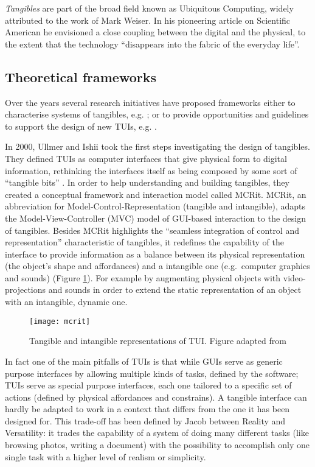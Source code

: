 \emph{Tangibles} are part of the broad field known as Ubiquitous Computing, widely attributed to the work of Mark Weiser. In his pioneering article on Scientific American \autocite{weiser1991computer} he envisioned a close coupling between the digital and the physical, to the extent that the technology ``disappears into the fabric of the everyday life''.

\subsection{Theoretical frameworks}\label{frameworks}

Over the years several research initiatives have proposed frameworks either to characterise systems of tangibles, e.g. \autocites{Fishkin:2004uv}{Jacob:2008vm}{Hornecker:2006uq}; or to provide opportunities and guidelines to support the design of new TUIs, e.g. \autocites{Benford:2005bo}{Shaer:2004ta}{Rogers:2006te}.

In 2000, Ullmer and Ishii \autocite*{Ullmer:2000vf} took the first steps investigating the design of tangibles. They defined TUIs as computer interfaces that give physical form to digital information, rethinking the interfaces itself as being composed by some sort of ``tangible bits'' \autocite{Ishii:1997ur}. In order to help understanding and building tangibles, they created a conceptual framework and interaction model called MCRit. MCRit, an abbreviation for Model-Control-Representation (tangible and intangible), adapts the Model-View-Controller (MVC) model of GUI-based interaction to the design of tangibles. Besides MCRit highlights the ``seamless integration of control and representation'' characteristic of tangibles, it redefines the capability of the interface to provide information as a balance between its physical representation (the object's shape and affordances) and a intangible one (e.g.~computer graphics and sounds) (Figure \ref{fig:mcrit-model}). For example by augmenting physical objects with video-projections and sounds in order to extend the static representation of an object with an intangible, dynamic one.

\begin{figure}
	[tbh] \centering 
	\texttt{[image: mcrit]} \caption{Tangible and intangible representations of TUI. Figure adapted from \protect\autocite{Ishii:2008fh}} \label{fig:mcrit-model} 
\end{figure}

In fact one of the main pitfalls of TUIs is that while GUIs serve as generic purpose interfaces by allowing multiple kinds of tasks, defined by the software; TUIs serve as special purpose interfaces, each one tailored to a specific set of actions (defined by physical affordances and constrains). A tangible interface can hardly be adapted to work in a context that differs from the one it has been designed for. This trade-off has been defined by Jacob \autocite*{Jacob:2008vm} between Reality and Versatility: it trades the capability of a system of doing many different tasks (like browsing photos, writing a document) with the possibility to accomplish only one single task with a higher level of realism or simplicity.

